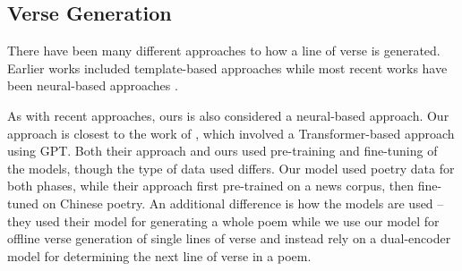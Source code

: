 \documentclass[11pt]{article}
\begin{document}
\subsection{Verse Generation}

There have been many different approaches to how a line of verse is generated.
Earlier works included template-based approaches \cite{colton2012,oliveira2012} while most recent works have been neural-based approaches \cite{ghazvininejad2016,ghazvininejad2017,hopkins2017,lau2018,vandecruys20,yi2018,zhang2014}.

As with recent approaches, ours is also considered a neural-based approach.
Our approach is closest to the work of , which involved a Transformer-based approach using GPT.
Both their approach and ours used pre-training and fine-tuning of the models, though the type of data used differs.
Our model used poetry data for both phases, while their approach first pre-trained on a news corpus, then fine-tuned on Chinese poetry.
An additional difference is how the models are used -- they used their model for generating a whole poem while we use our model for offline verse generation of single lines of verse and instead rely on a dual-encoder model for determining the next line of verse in a poem.








\end{document}
